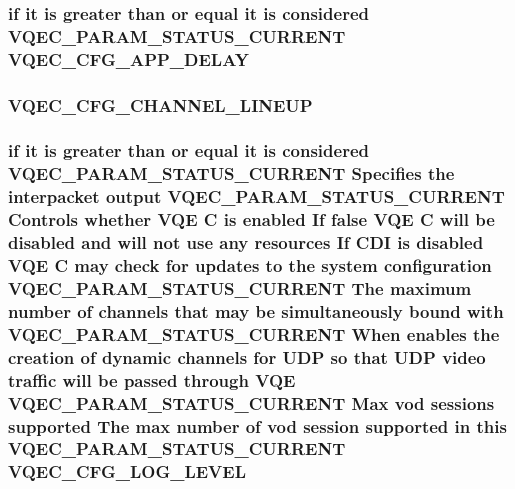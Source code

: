 \subsubsection{\setlength{\rightskip}{0pt plus 5cm}if it is greater than or equal it is considered VQEC\_\-PARAM\_\-STATUS\_\-CURRENT \bf{VQEC\_\-CFG\_\-APP\_\-DELAY}}\label{vqec__cfg__settings_8h_a2284379e5f53a63d044d83d1c389018}


\subsubsection{\setlength{\rightskip}{0pt plus 5cm}\bf{VQEC\_\-CFG\_\-CHANNEL\_\-LINEUP}}\label{vqec__cfg__settings_8h_4848c2d78648bb9f25bb37699471afe8}


\subsubsection{\setlength{\rightskip}{0pt plus 5cm}if it is greater than or equal it is considered VQEC\_\-PARAM\_\-STATUS\_\-CURRENT Specifies the interpacket output VQEC\_\-PARAM\_\-STATUS\_\-CURRENT Controls whether VQE \bf{C} is enabled If false VQE \bf{C} will be disabled and will not use any resources If CDI is disabled VQE \bf{C} may check for updates \bf{to} the system configuration VQEC\_\-PARAM\_\-STATUS\_\-CURRENT The maximum number of \bf{channels} that may be simultaneously bound with VQEC\_\-PARAM\_\-STATUS\_\-CURRENT When enables the creation of dynamic \bf{channels} for UDP so that UDP video traffic will be passed through VQE VQEC\_\-PARAM\_\-STATUS\_\-CURRENT Max vod sessions supported The max number of vod session supported in \bf{this} VQEC\_\-PARAM\_\-STATUS\_\-CURRENT \bf{VQEC\_\-CFG\_\-LOG\_\-LEVEL}}\label{vqec__cfg__settings_8h_81d2a8bff68c49710bc54598b339df25}


